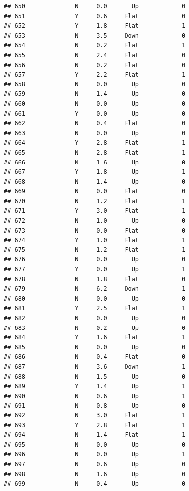 \documentclass[
]{article}
\begin{document}
\begin{verbatim}
## 650              N     0.0       Up            0
## 651              Y     0.6     Flat            0
## 652              Y     1.8     Flat            1
## 653              N     3.5     Down            0
## 654              N     0.2     Flat            1
## 655              N     2.4     Flat            0
## 656              N     0.2     Flat            0
## 657              Y     2.2     Flat            1
## 658              N     0.0       Up            0
## 659              N     1.4       Up            0
## 660              N     0.0       Up            0
## 661              Y     0.0       Up            0
## 662              N     0.4     Flat            0
## 663              N     0.0       Up            0
## 664              Y     2.8     Flat            1
## 665              N     2.8     Flat            1
## 666              N     1.6       Up            0
## 667              Y     1.8       Up            1
## 668              N     1.4       Up            0
## 669              N     0.0     Flat            0
## 670              N     1.2     Flat            1
## 671              Y     3.0     Flat            1
## 672              N     1.0       Up            0
## 673              N     0.0     Flat            0
## 674              Y     1.0     Flat            1
## 675              N     1.2     Flat            1
## 676              N     0.0       Up            0
## 677              Y     0.0       Up            1
## 678              N     1.8     Flat            0
## 679              N     6.2     Down            1
## 680              N     0.0       Up            0
## 681              Y     2.5     Flat            1
## 682              N     0.0       Up            0
## 683              N     0.2       Up            0
## 684              Y     1.6     Flat            1
## 685              N     0.0       Up            0
## 686              N     0.4     Flat            0
## 687              N     3.6     Down            1
## 688              N     1.5       Up            0
## 689              Y     1.4       Up            1
## 690              N     0.6       Up            1
## 691              N     0.8       Up            0
## 692              N     3.0     Flat            1
## 693              Y     2.8     Flat            1
## 694              N     1.4     Flat            1
## 695              N     0.0       Up            0
## 696              N     0.0       Up            1
## 697              N     0.6       Up            0
## 698              N     1.6       Up            0
## 699              N     0.4       Up            0

\end{verbatim}
\end{document}

